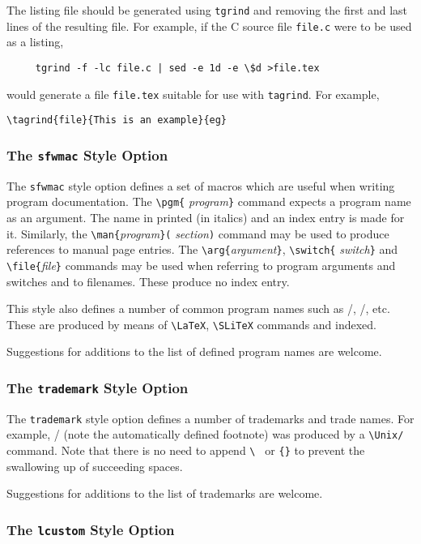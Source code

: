 The listing file should be generated using {\tt tgrind} and removing
the first and last lines of the resulting file. For example, if the C
source file {\tt file.c} were to be used as a listing,
\begin{verbatim}
     tgrind -f -lc file.c | sed -e 1d -e \$d >file.tex
\end{verbatim}
would generate a file {\tt file.tex} suitable for use
with \verb|tagrind|. For example,
\begin{verbatim}
\tagrind{file}{This is an example}{eg}
\end{verbatim}

\subsubsection{The {\tt sfwmac} Style Option}

The {\tt sfwmac} style option defines a set of macros which are
useful when writing program documentation.  The \verb|\pgm{|{\it
program\/}\verb|}| command expects a program name as an argument.
The name in printed (in italics) and an index entry is made for it.
Similarly, the \verb|\man{|{\it program\/}\verb|}(|{\it
section\/}\verb|)| command may be used to produce references to
manual page entries.
The \verb|\arg{|{\it argument\/}\verb|}|, \verb|\switch{|{\it
switch\/}\verb|}| and \verb|\file{|{\it file\/}\verb|}| commands may be
used when referring to program arguments and switches  and to
filenames. These produce no index entry.

This style also defines a number of common program names such as
\latex/, \slitex/, etc.  These are produced by means of
\verb|\LaTeX|, \verb|\SLiTeX| commands and indexed.  

Suggestions for additions to the list of defined program names are
welcome.

\subsubsection{The {\tt trademark} Style Option}

The {\tt trademark} style option defines a number of trademarks and
trade names.  For example, \Unix/ (note the automatically defined
footnote) was produced by a \verb|\Unix/| command.  Note that there
is no need to append \verb*|\ | or \verb|{}| to prevent the
swallowing up of succeeding spaces.

Suggestions for additions to the list of trademarks are welcome.

\subsubsection{The {\tt lcustom} Style Option}

